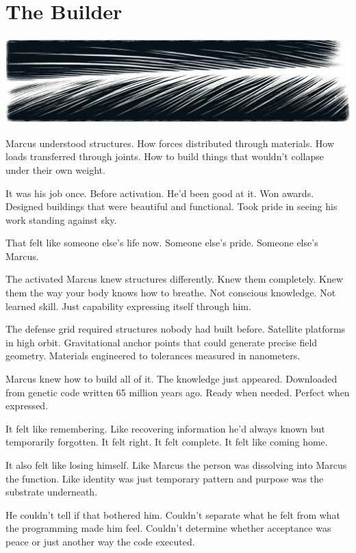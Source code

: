 \chapter{The Builder}
\label{ch:27}



\begin{center}
\includegraphics[width=\textwidth]{images/chapterImages/genesis_sketch_00124_.png}
\end{center}

Marcus understood structures. How forces distributed through materials. How loads transferred through joints. How to build things that wouldn't collapse under their own weight.

It was his job once. Before activation. He'd been good at it. Won awards. Designed buildings that were beautiful and functional. Took pride in seeing his work standing against sky.

That felt like someone else's life now. Someone else's pride. Someone else's Marcus.

The activated Marcus knew structures differently. Knew them completely. Knew them the way your body knows how to breathe. Not conscious knowledge. Not learned skill. Just capability expressing itself through him.

The defense grid required structures nobody had built before. Satellite platforms in high orbit. Gravitational anchor points that could generate precise field geometry. Materials engineered to tolerances measured in nanometers.

Marcus knew how to build all of it. The knowledge just appeared. Downloaded from genetic code written 65 million years ago. Ready when needed. Perfect when expressed.

It felt like remembering. Like recovering information he'd always known but temporarily forgotten. It felt right. It felt complete. It felt like coming home.

It also felt like losing himself. Like Marcus the person was dissolving into Marcus the function. Like identity was just temporary pattern and purpose was the substrate underneath.

He couldn't tell if that bothered him. Couldn't separate what he felt from what the programming made him feel. Couldn't determine whether acceptance was peace or just another way the code executed.

